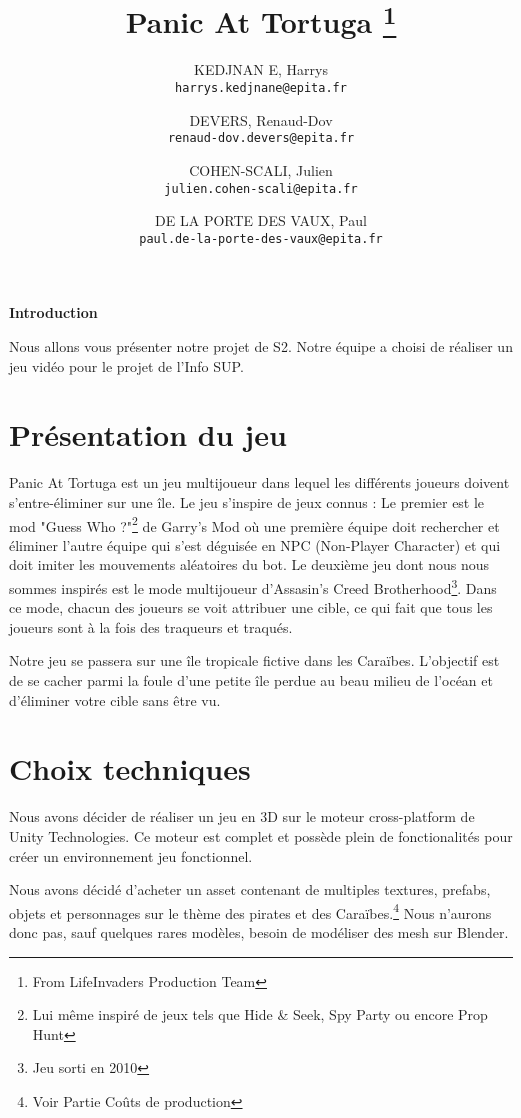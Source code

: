 \documentclass[french, 12pt, letterpaper, twoside]{article}
\title{Panic At Tortuga \thanks{From LifeInvaders Production Team}}
\author{
    KEDJNAN
    E, Harrys\\
    \texttt{harrys.kedjnane@epita.fr}
    \and
    DEVERS, Renaud-Dov\\
    \texttt{renaud-dov.devers@epita.fr}
    \and
    COHEN-SCALI, Julien\\
    \texttt{julien.cohen-scali@epita.fr}
    \and
    DE LA PORTE DES VAUX, Paul\\
    \texttt{paul.de-la-porte-des-vaux@epita.fr}
    
}
\begin{document}
\begin{titlepage}
\maketitle
\end{titlepage}

\begin{center}
    \textbf{Introduction}

    Nous allons vous présenter notre projet de S2.
    Notre équipe a choisi de réaliser un jeu vidéo pour le projet de l'Info SUP.
\end{center}

\tableofcontents
\newpage

\section{Présentation du jeu}
\begin{flushleft}
Panic At Tortuga est un jeu multijoueur dans lequel les différents joueurs doivent s'entre-éliminer sur une île.
Le jeu s'inspire de jeux connus : Le premier est le mod "Guess Who ?"\footnote{Lui même inspiré de jeux tels que Hide \& Seek, Spy Party ou encore Prop Hunt} de Garry's Mod
    où une première équipe doit rechercher et éliminer l'autre équipe qui s'est déguisée en NPC (Non-Player Character) et qui doit imiter les mouvements aléatoires du bot.
Le deuxième jeu dont nous nous sommes inspirés est le mode multijoueur d'Assasin's Creed Brotherhood\footnote{Jeu sorti en 2010}.
Dans ce mode, chacun des joueurs se voit attribuer une cible, ce qui fait que tous les joueurs sont à la fois des traqueurs et traqués.

Notre jeu se passera sur une île tropicale fictive dans les Caraïbes.
L'objectif est de se cacher parmi la foule d'une petite île perdue au beau milieu de l'océan et d'éliminer votre cible sans être vu.
\end{flushleft}

\section{Choix techniques}

Nous avons décider de réaliser un jeu en 3D sur le moteur cross-platform de Unity Technologies.
Ce moteur est complet et possède plein de fonctionalités pour créer un environnement jeu fonctionnel.

Nous avons décidé d'acheter un asset contenant de multiples textures, prefabs, objets et personnages sur le thème des pirates et des Caraïbes.\footnote{Voir Partie Coûts de production}
Nous n'aurons donc pas, sauf quelques rares modèles, besoin de modéliser des mesh sur Blender.
\end{document}
